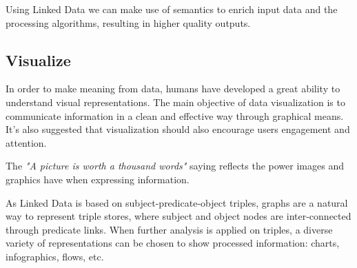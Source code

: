 Using Linked Data we can make use of semantics to enrich input data and the processing algorithms, resulting in higher quality outputs.

\subsection{Visualize}

In order to make meaning from data, humans have developed a great ability to understand visual representations. The main objective of data visualization is to communicate information in a clean and effective way through graphical means. It's also suggested that visualization should also encourage users engagement and attention.

The \textit{"A picture is worth a thousand words"} saying reflects the power images and graphics have when expressing information.

As Linked Data is based on subject-predicate-object triples, graphs are a natural way to represent triple stores, where subject and object nodes are inter-connected through predicate links. When further analysis is applied on triples, a diverse variety of representations can be chosen to show processed information: charts, infographics, flows, etc.

